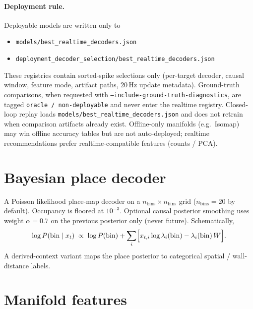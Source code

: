 \documentclass[11pt,a4paper]{article}
\begin{document}
\paragraph{Deployment rule.}
Deployable models are written only to
\begin{itemize}[leftmargin=*]
  \item \texttt{models/best\_realtime\_decoders.json}
  \item \texttt{deployment\_decoder\_selection/best\_realtime\_decoders.json}
\end{itemize}
These registries contain sorted-spike selections only (per-target decoder, causal window, feature mode, artifact paths, $20\,\mathrm{Hz}$ update metadata).
Ground-truth comparisons, when requested with \texttt{--include-ground-truth-diagnostics}, are tagged \texttt{oracle / non-deployable} and never enter the realtime registry.
Closed-loop replay loads \texttt{models/best\_realtime\_decoders.json} and does not retrain when comparison artifacts already exist.
Offline-only manifolds (e.g.\ Isomap) may win offline accuracy tables but are not auto-deployed; realtime recommendations prefer realtime-compatible features (counts / PCA).

\section{Bayesian place decoder}
\label{sec:bayes}

A Poisson likelihood place-map decoder on a $n_{\mathrm{bins}}\times n_{\mathrm{bins}}$ grid ($n_{\mathrm{bins}}=20$ by default).
Occupancy is floored at $10^{-3}$.
Optional causal posterior smoothing uses weight $\alpha=0.7$ on the previous posterior only (never future).
Schematically,
\begin{equation}
  \log P(\mathrm{bin}\mid x_t)
  \;\propto\;
  \log P(\mathrm{bin})
  +
  \sum_i
  \Bigl[
    x_{t,i}\log\lambda_i(\mathrm{bin})
    -
    \lambda_i(\mathrm{bin})\, W
  \Bigr].
\end{equation}
A derived-context variant maps the place posterior to categorical spatial / wall-distance labels.

\section{Manifold features}
\end{document}

